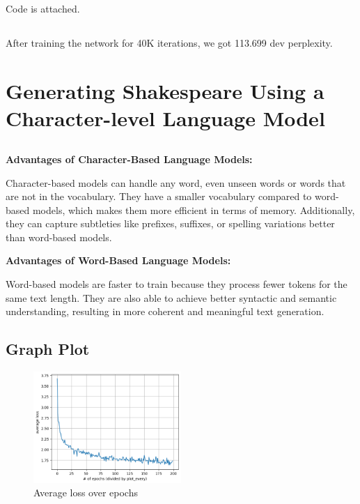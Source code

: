 \documentclass{article}
\begin{document}
\subsection{}
Code is attached.
\subsection{}
After training the network for 40K iterations, we got 113.699 dev perplexity.

\section{Generating Shakespeare Using a Character-level Language Model}
\subsection{}
\textbf{Advantages of Character-Based Language Models:} 

Character-based models can handle any word, even unseen words or words that are not in the vocabulary. They have a smaller vocabulary compared to word-based models, which makes them more efficient in terms of memory. Additionally, they can capture subtleties like prefixes, suffixes, or spelling variations better than word-based models.

\textbf{Advantages of Word-Based Language Models:} 

Word-based models are faster to train because they process fewer tokens for the same text length. They are also able to achieve better syntactic and semantic understanding, resulting in more coherent and meaningful text generation.
\subsection{Graph Plot}
\begin{figure}[h!]
    \centering
    \includegraphics[width=0.5\textwidth]{loss:epochs shakesepeer model}
    \caption{Average loss over epochs}
    \label{fig:example}
\end{figure}
\end{document}
